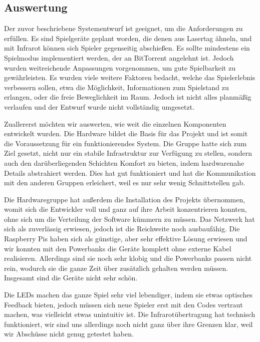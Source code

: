 \subsection{Auswertung}
\label{sec:auswertung}

Der zuvor beschriebene Systementwurf ist geeignet, um die Anforderungen zu
erfüllen. Es sind Spielgeräte geplant worden, die denen aus Lasertag ähneln,
und mit Infrarot können sich Spieler gegenseitig abschießen. Es sollte mindestens ein
Spielmodus implementiert werden, der an BitTorrent angelehnt ist. Jedoch
wurden weitreichende Anpassungen vorgenommen, um gute Spielbarkeit zu gewährleisten. Es wurden viele weitere
Faktoren bedacht, welche das Spielerlebnis verbessern sollen, etwa die
Möglichkeit, Informationen zum Spielstand zu erlangen, oder die freie
Beweglichkeit im Raum. Jedoch ist nicht alles planmäßig verlaufen und der
Entwurf wurde nicht vollständig umgesetzt.

Zuallererst möchten wir auswerten, wie weit die einzelnen Komponenten
entwickelt wurden. Die Hardware bildet die Basis für das Projekt und ist somit
die Voraussetzung für ein funktionierendes System. Die Gruppe hatte sich zum
Ziel gesetzt, nicht nur ein stabile Infrastruktur zur Verfügung zu stellen,
sondern auch den darüberliegenden Schichten Komfort zu bieten, indem
hardwarenahe Details abstrahiert werden. Dies hat gut funktioniert und hat die
Kommunikation mit den anderen Gruppen erleichert, weil es nur sehr wenig
Schnittstellen gab. 

Die Hardwaregruppe hat außerdem die Installation des 
Projekts übernommen, womit sich die Entwickler voll und ganz auf ihre Arbeit
konzentrieren konnten, ohne sich um die Verteilung der Software kümmern zu
müssen. Das Netzwerk hat sich als zuverlässig erwiesen, jedoch ist die
Reichweite noch ausbaufähig. Die Raspberry Pis haben sich als günstige, aber
sehr effektive Lösung erwiesen und wir konnten mit den Powerbanks die
Geräte komplett ohne externe Kabel realisieren. Allerdings sind sie noch sehr
klobig und die Powerbanks passen nicht rein, wodurch sie die ganze Zeit über
zusätzlich gehalten werden müssen. Insgesamt sind die Geräte nicht sehr schön.

Die LEDs machen das ganze Spiel sehr viel lebendiger, indem sie etwas
optisches Feedback bieten, jedoch müssen sich neue Spieler erst mit den Codes
vertraut machen, was vielleicht etwas unintuitiv ist. Die Infrarotübertragung
hat technisch funktioniert, wir sind uns allerdings noch nicht ganz über ihre
Grenzen klar, weil wir Abschüsse nicht genug getestet haben.

